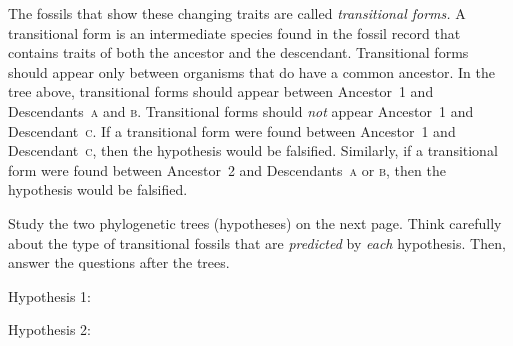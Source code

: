 \documentclass[12pt, hidelinks]{exam}
\begin{document}
The fossils that show these changing traits are called \textit{transitional forms.} A transitional form is an intermediate species found in the fossil record that contains traits of both the ancestor and the descendant. Transitional forms should appear only between organisms that do have a common ancestor.  In the tree above, transitional forms should appear between Ancestor~1 and Descendants~\textsc{a} and \textsc{b}. Transitional forms should \textit{not} appear Ancestor~1 and Descendant~\textsc{c}.  If a transitional form were found between Ancestor~1 and Descendant~\textsc{c}, then the hypothesis would be falsified. Similarly, if a transitional form were found between Ancestor~2 and Descendants~\textsc{a} or \textsc{b}, then the hypothesis would be falsified.

\begin{questions}

\question
Study the two phylogenetic trees (hypotheses) on the next page.  Think carefully about the type of transitional fossils that are \emph{predicted} by \textit{each} hypothesis. Then, answer the questions after the trees.

\newpage

Hypothesis 1:

\begin{center}

\label{hypothesis1}

\end{center}

\bigskip

Hypothesis 2:

\begin{center}

\begin{tikzpicture}
	[scale=0.85,branch/.style={thick}]
	

\end{tikzpicture}
\end{center}
\end{questions}
\end{document}
